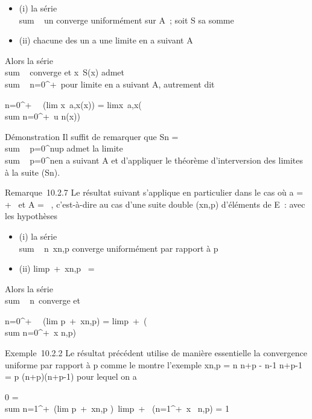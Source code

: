 \begin{itemize}
\itemsep1pt\parskip0pt
\item
  (i) la série \\sum ~
  un converge uniformément sur A~; soit S sa somme
\item
  (ii) chacune des un a une limite \elln en a suivant A
\end{itemize}

Alors la série \\sum ~
\elln converge et x\mapsto~S(x) admet
\\sum ~
n=0^+\infty~\elln pour limite en a suivant A, autrement
dit

\sum n=0^+\infty~~\left
(lim x\rightarrow~a,x\inAun(x)\right ) =
limx\rightarrow~a,x\inA\left (\\sum
n=0^+\infty~u n(x)\right )

Démonstration Il suffit de remarquer que Sn
= \\sum ~
p=0^nup admet la limite
\\sum ~
p=0^n\ellp en a suivant A et d'appliquer le
théorème d'interversion des limites à la suite (Sn).

Remarque~10.2.7 Le résultat suivant s'applique en particulier dans le
cas où a = +\infty~ et A = ~, c'est-à-dire au cas d'une suite double
(xn,p) d'éléments de E~: avec les hypothèses

\begin{itemize}
\itemsep1pt\parskip0pt
\item
  (i) la série \\sum ~
  n\in{}~xn,p converge uniformément par rapport à p
\item
  (ii) limp\rightarrow~+\infty~xn,p~ =
  \elln
\end{itemize}

Alors la série \\sum ~
n\in{}~\elln converge et

\sum n=0^+\infty~~\left
(lim p\rightarrow~+\infty~xn,p\right ) =
limp\rightarrow~+\infty~\left (\\sum
n=0^+\infty~x n,p\right )

Exemple~10.2.2 Le résultat précédent utilise de manière essentielle la
convergence uniforme par rapport à p comme le montre l'exemple
xn,p = n \over n+p - n-1
\over n+p-1 = p \over (n+p)(n+p-1)
pour lequel on a

0 = \\sum
n=1^+\infty~\left (lim
p\rightarrow~+\infty~xn,p\right
)\neq~limp\rightarrow~+\infty~\left
(\sum n=1^+\infty~x~
n,p\right ) = 1

